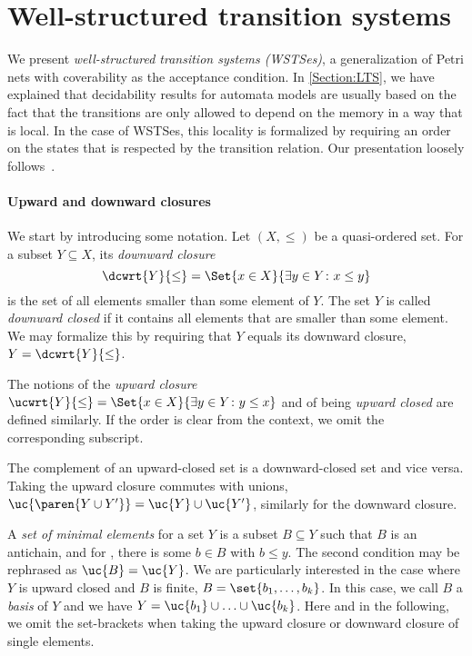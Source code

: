 \documentclass[../../diss.tex]{subfiles}
\begin{document}
\section{Well-structured transition systems}%
\label{Section:WSTS}%

We present \emph{well-structured transition systems (WSTSes)}, a generalization of Petri nets with coverability as the acceptance condition.
In \cref{Section:LTS}, we have explained that decidability results for automata models are usually based on the fact that the transitions are only allowed to depend on the memory in a way that is local.
In the case of WSTSes, this locality is formalized by requiring an order on the states that is respected by the transition relation.
Our presentation loosely follows~\cite{FinkelS01}.

\paragraph{Upward and downward closures}

We start by introducing some notation.
Let $(X,\leq)$ be a quasi-ordered set.
For a subset $Y \subseteq X$, its \emph{downward closure}
\[
    \dcwrt{Y}{\leq} = \Set{ x \in X}{ \exists y \in Y \colon x \leq y}
\]
is the set of all elements smaller than some element of $Y$.
The set $Y$ is called \emph{downward closed} if it contains all elements that are smaller than some element.
We may formalize this by requiring that $Y$ equals its downward closure, $Y = \dcwrt{Y}{\leq}$.

The notions of the \emph{upward closure} $\ucwrt{Y}{\leq} = \Set{ x \in X}{ \exists y \in Y \colon y \leq x}$ and of being \emph{upward closed} are defined similarly.
If the order is clear from the context, we omit the corresponding subscript.

The complement of an upward-closed set is a downward-closed set and vice versa.
Taking the upward closure commutes with unions, $\uc{\paren{Y \cup Y'}} = \uc{Y} \cup \uc{Y'}$, similarly for the downward closure.

A \emph{set of minimal elements} for a set $Y$ is a subset $B \subseteq Y$ such that $B$ is an antichain, and for , there is some $b \in B$ with $b \leq y$.
The second condition may be rephrased as $\uc{B} = \uc{Y}$.
We are particularly interested in the case where $Y$ is upward closed and $B$ is finite, $B = \set{b_1, \ldots, b_k}$.
In this case, we call $B$ a \emph{basis} of $Y$ and we have $Y = \uc{b_1} \cup \ldots \cup \uc{b_k}$.
Here and in the following, we omit the set-brackets when taking the upward closure or downward closure of single elements.
\end{document}
